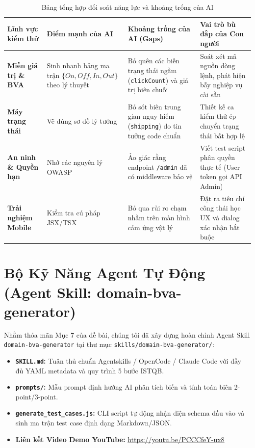 \documentclass[11pt,a4paper]{article}
\begin{document}
\begin{table}[h]
\centering
\small
\begin{tabularx}{\textwidth}{L{2.8cm} L{3.5cm} L{4.2cm} Y}
\toprule
\textbf{Lĩnh vực kiểm thử} & \textbf{Điểm mạnh của AI} & \textbf{Khoảng trống của AI (Gaps)} & \textbf{Vai trò bù đắp của Con người} \\
\midrule
\textbf{Miền giá trị \& BVA} & Sinh nhanh bảng ma trận $\{On, Off, In, Out\}$ theo lý thuyết & Bỏ quên các biến trạng thái ngầm (\texttt{clickCount}) và giá trị biên chuỗi & Soát xét mã nguồn dòng lệnh, phát hiện bẫy nghiệp vụ cài sẵn \\
\midrule
\textbf{Máy trạng thái} & Vẽ đúng sơ đồ lý tưởng & Bỏ sót biên trung gian nguy hiểm (\texttt{shipping}) do tin tưởng code chuẩn & Thiết kế ca kiểm thử ép chuyển trạng thái bất hợp lệ \\
\midrule
\textbf{An ninh \& Quyền hạn} & Nhớ các nguyên lý OWASP & Ảo giác rằng endpoint \texttt{/admin} đã có middleware bảo vệ & Viết test script phân quyền thực tế (User token gọi API Admin) \\
\midrule
\textbf{Trải nghiệm Mobile} & Kiểm tra cú pháp JSX/TSX & Bỏ qua rủi ro chạm nhầm trên màn hình cảm ứng vật lý & Đặt ra tiêu chí công thái học UX và dialog xác nhận bắt buộc \\
\bottomrule
\end{tabularx}
\caption{Bảng tổng hợp đối soát năng lực và khoảng trống của AI}
\end{table}

\section{Bộ Kỹ Năng Agent Tự Động (Agent Skill: domain-bva-generator)}

Nhằm thỏa mãn Mục 7 của đề bài, chúng tôi đã xây dựng hoàn chỉnh Agent Skill \texttt{domain-bva-generator} tại thư mục \texttt{skills/domain-bva-generator/}:
\begin{itemize}
    \item \textbf{\texttt{SKILL.md}:} Tuân thủ chuẩn Agentskills / OpenCode / Claude Code với đầy đủ YAML metadata và quy trình 5 bước ISTQB.
    \item \textbf{\texttt{prompts/}:} Mẫu prompt định hướng AI phân tích biến và tính toán biên 2-point/3-point.
    \item \textbf{\texttt{generate\_test\_cases.js}:} CLI script tự động nhận diện schema đầu vào và sinh ma trận test case định dạng Markdown/JSON.
    \item \textbf{Liên kết Video Demo YouTube:} \url{https://youtu.be/PCCCfeY-ux8}
\end{itemize}
\end{document}
